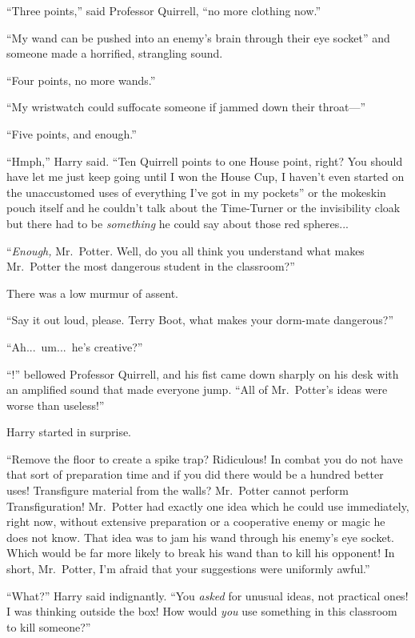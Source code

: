 “Three points,” said Professor Quirrell, “no more clothing now.”

“My wand can be pushed into an enemy’s brain through their eye socket” and someone made a horrified, strangling sound.

“Four points, no more wands.”

“My wristwatch could suffocate someone if jammed down their throat—”

“Five points, and enough.”

“Hmph,” Harry said. “Ten Quirrell points to one House point, right? You should have let me just keep going until I won the House Cup, I haven’t even started on the unaccustomed uses of everything I’ve got in my pockets” or the mokeskin pouch itself and he couldn’t talk about the Time-Turner or the invisibility cloak but there had to be \emph{something} he could say about those red spheres...

“\emph{Enough,} Mr.~Potter. Well, do you all think you understand what makes Mr.~Potter the most dangerous student in the classroom?”

There was a low murmur of assent.

“Say it out loud, please. Terry Boot, what makes your dorm-mate dangerous?”

“Ah...\ um...\ he’s creative?”

\sloppypar“!” bellowed Professor Quirrell, and his fist came down sharply on his desk with an amplified sound that made everyone jump. “All of Mr.~Potter’s ideas were worse than useless!”

Harry started in surprise.

“Remove the floor to create a spike trap? Ridiculous! In combat you do not have that sort of preparation time and if you did there would be a hundred better uses! Transfigure material from the walls? Mr.~Potter cannot perform Transfiguration! Mr.~Potter had exactly one idea which he could use immediately, right now, without extensive preparation or a cooperative enemy or magic he does not know. That idea was to jam his wand through his enemy’s eye socket. Which would be far more likely to break his wand than to kill his opponent! In short, Mr.~Potter, I’m afraid that your suggestions were uniformly awful.”

“What?” Harry said indignantly. “You \emph{asked} for unusual ideas, not practical ones! I was thinking outside the box! How would \emph{you} use something in this classroom to kill someone?”

